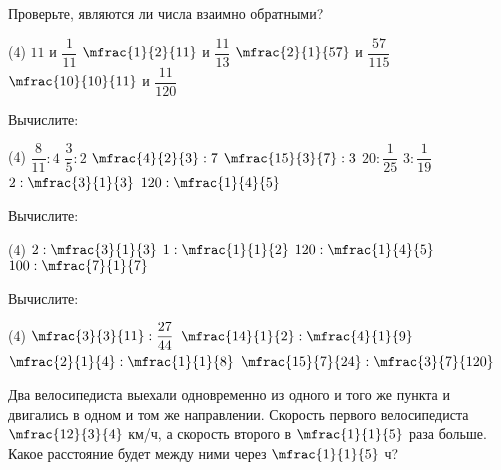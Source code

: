 %
%
\begin{homework}[number=1]
	\begin{listofex}
		\item Проверьте, являются ли числа взаимно обратными?
		\begin{tasks}(4)
			\task \( 11 \) и \( \dfrac{1}{11} \)
			\task \( \mfrac{1}{2}{11} \) и \( \dfrac{11}{13} \)
			\task \( \mfrac{2}{1}{57} \) и \( \dfrac{57}{115} \)
			\task \( \mfrac{10}{10}{11} \) и \( \dfrac{11}{120} \)
		\end{tasks}
		\item Вычислите:
		\begin{tasks}(4)
			\task \( \dfrac{8}{11}:4 \)
			\task \( \dfrac{3}{5}:2 \)
			\task \( \mfrac{4}{2}{3}:7 \)
			\task \( \mfrac{15}{3}{7}:3 \)
			\task \( 20:\dfrac{1}{25} \)
			\task \( 3:\dfrac{1}{19} \)
			\task \( 2:\mfrac{3}{1}{3} \)
			\task \( 120:\mfrac{1}{4}{5} \)
		\end{tasks}
		\item Вычислите:
		\begin{tasks}(4)
			\task \( 2:\mfrac{3}{1}{3} \)
			\task \( 1:\mfrac{1}{1}{2} \)
			\task \( 120:\mfrac{1}{4}{5} \)
			\task \( 100:\mfrac{7}{1}{7} \)
		\end{tasks}
		\item Вычислите:
		\begin{tasks}(4)
			\task \( \mfrac{3}{3}{11}:\dfrac{27}{44} \)
			\task \( \mfrac{14}{1}{2}:\mfrac{4}{1}{9} \)
			\task \( \mfrac{2}{1}{4}:\mfrac{1}{1}{8} \)
			\task \( \mfrac{15}{7}{24}:\mfrac{3}{7}{120} \)
		\end{tasks}
		\item Два велосипедиста выехали одновременно из одного и того же пункта и двигались в одном и том же направлении. Скорость первого велосипедиста \( \mfrac{12}{3}{4} \) км/ч, а скорость второго в \( \mfrac{1}{1}{5} \) раза больше. Какое расстояние будет между ними через \( \mfrac{1}{1}{5} \) ч?
	\end{listofex}
\end{homework}
%
%

